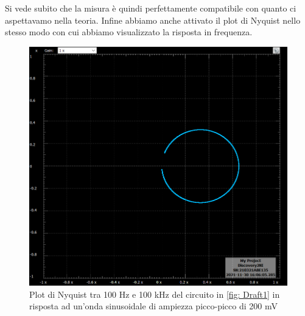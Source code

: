 \documentclass[10pt, a4paper, italian]{article}
\begin{document}
Si vede subito che la misura è quindi perfettamente compatibile con quanto ci aspettavamo nella teoria.
Infine abbiamo anche attivato il plot di Nyquist nello stesso modo con cui abbiamo visualizzato la risposta in frequenza.
\begin{figure}[H]
    \centering
	\includegraphics[scale=0.5]{3a_nyquist}
    \caption{Plot di Nyquist tra 100 Hz e 100 kHz del circuito in \cref{fig: Draft1} in risposta ad un'onda sinusoidale di ampiezza picco-picco di 200 mV }
    \label{fig: 3a_nyquist}
\end{figure}
\end{document}
